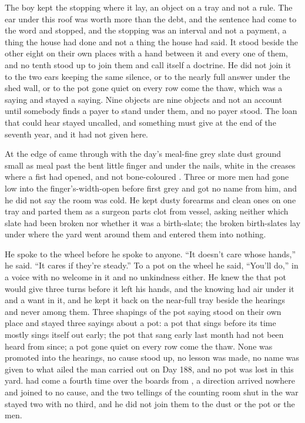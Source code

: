 The boy kept the stopping where it lay, an object on a tray and not a rule. The ear under this roof was worth more than the debt, and the sentence had come to the word and stopped, and the stopping was an interval and not a payment, a thing the house had done and not a thing the house had said. It stood beside the other eight on their own places with a hand between it and every one of them, and no tenth stood up to join them and call itself a doctrine. He did not join it to the two ears keeping the same silence, or to the nearly full answer under the shed wall, or to the pot gone quiet on every row come the thaw, which was a saying and stayed a saying. Nine objects are nine objects and not an account until somebody finds a payer to stand under them, and no payer stood. The loan that could hear stayed uncalled, and something must give at the end of the seventh year, and it had not given here.

At the edge of   came through with the day's meal-fine grey slate dust ground small as meal past the bent little finger and under the nails, white in the creases where a fist had opened, and not bone-coloured . Three or more men had gone low into the finger's-width-open  before first grey and got no name from him, and he did not say the room was cold. He kept dusty forearms and clean ones on one tray and parted them as a surgeon parts clot from vessel, asking neither which slate had been broken nor whether it was a birth-slate; the broken birth-slates lay under  where the yard went around them and entered them into nothing.

He spoke to the wheel before he spoke to anyone. “It doesn't care whose hands,” he said. “It cares if they're steady.” To a pot on the wheel he said, “You'll do,” in a voice with no welcome in it and no unkindness either. He knew the  that pot would give three turns before it left his hands, and the knowing had air under it and a want in it, and he kept it back on the near-full tray beside the hearings and never among them. Three shapings of the pot saying stood on their own place and stayed three sayings about a pot: a pot that sings before its time mostly sings itself out early; the pot that sang early last month had not been heard from since; a pot gone quiet on every row come the thaw. None was promoted into the hearings, no cause stood up, no lesson was made, no name was given to what ailed the man carried out on Day 188, and no pot was lost in this yard.  had come a fourth time over the boards from , a direction arrived nowhere and joined to no cause, and the two tellings of the counting room shut in the war stayed two with no third, and he did not join them to the dust or the pot or the men.


